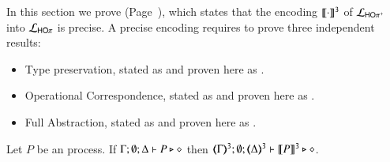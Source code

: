 

In this section we prove  (Page~\pageref{f:enc:hoppptohop}), which
states that the encoding  $\llbracket\cdot\rrbracket^\mathtt{3}$ of 
$\mathcal{L}_{\mathsf{HO\pi^{+}}}$ into $\mathcal{L}_{\mathsf{HO}\pi}$ is precise.
A precise encoding requires to prove three independent results:
\begin{itemize}
	\item	Type preservation, stated as 
	and proven here as .
	\item	Operational Correspondence, stated as  and proven here as .
	\item	Full Abstraction, stated as 
	and proven here as .
\end{itemize}

\begin{proposition}\myrm
	\label{app:prop:typepres_HOpp_to_HOp}
	Let $P$ be an \HOpp process.
	If $\Gamma; \emptyset; \Delta \vdash P \triangleright \diamond$ then 
	$\tmap{\Gamma}{3}; \emptyset; \tmap{\Delta}{3} \proves \pmap{P}{3} \hastype \Proc$. 
\end{proposition}

